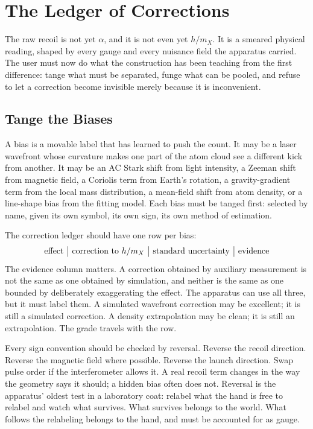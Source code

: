 \chapter{The Ledger of Corrections}

The raw recoil is not yet \(\alpha\), and it is not even yet \(h/m_X\). It is a smeared physical reading, shaped
by every gauge and every nuisance field the apparatus carried. The user must now do what the construction has
been teaching from the first difference: tange what must be separated, funge what can be pooled, and refuse to
let a correction become invisible merely because it is inconvenient.

\section{Tange the Biases}

A bias is a movable label that has learned to push the count. It may be a laser wavefront whose curvature makes
one part of the atom cloud see a different kick from another. It may be an AC Stark shift from light intensity,
a Zeeman shift from magnetic field, a Coriolis term from Earth's rotation, a gravity-gradient term from the local
mass distribution, a mean-field shift from atom density, or a line-shape bias from the fitting model. Each bias
must be tanged first: selected by name, given its own symbol, its own sign, its own method of estimation.

The correction ledger should have one row per bias:
\[
\begin{array}{c|c|c|c}
\hbox{effect} & \hbox{correction to } h/m_X & \hbox{standard uncertainty} & \hbox{evidence}\\
\end{array}
\]
The evidence column matters. A correction obtained by auxiliary measurement is not the same as one obtained by
simulation, and neither is the same as one bounded by deliberately exaggerating the effect. The apparatus can use
all three, but it must label them. A simulated wavefront correction may be excellent; it is still a simulated
correction. A density extrapolation may be clean; it is still an extrapolation. The grade travels with the row.

Every sign convention should be checked by reversal. Reverse the recoil direction. Reverse the magnetic field
where possible. Reverse the launch direction. Swap pulse order if the interferometer allows it. A real recoil
term changes in the way the geometry says it should; a hidden bias often does not. Reversal is the apparatus'
oldest test in a laboratory coat: relabel what the hand is free to relabel and watch what survives. What
survives belongs to the world. What follows the relabeling belongs to the hand, and must be accounted for as
gauge.

